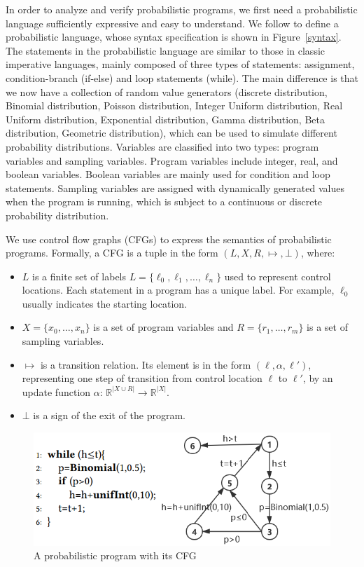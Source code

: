 \documentclass[sigconf,review, anonymous]{acmart}
\begin{document}
In order to analyze and verify probabilistic programs, we first need a probabilistic language sufficiently expressive and easy to understand. We follow \cite{Sankaranarayanan2013Static} to define a probabilistic language, whose syntax specification is shown in Figure~\ref{syntax}. The statements in the probabilistic language are similar to those in classic imperative languages, mainly composed of three types of statements: assignment, condition-branch (if-else) and loop statements (while). The main difference is that we now have a collection of random value generators (discrete distribution, Binomial distribution, Poisson distribution, Integer Uniform distribution, Real Uniform distribution, Exponential distribution, Gamma distribution, Beta distribution, Geometric distribution), which can be used to simulate different probability distributions. Variables are classified into two types: program variables and sampling variables. Program variables include integer, real, and boolean variables. Boolean variables are mainly used for condition and loop statements. Sampling variables are assigned with dynamically generated values when the program is running, which is subject to a continuous or discrete probability distribution.


We use control flow graphs (CFGs) to express the semantics of probabilistic programs. Formally, a CFG is a tuple in the form $(L,X,R,\mapsto,\bot)$, where:

\begin{itemize}
	\item $L$ is a finite set of labels $L=\{\ell_0,\ell_1,\dots,\ell_n\}$ used to represent control locations. Each statement in a program has a unique label. For example, $\ell_0$ usually indicates the starting location.
	
	\item $X=\{x_0,\dots,x_n\}$ is a set of program variables and $R=\{r_1,\dots,r_m\}$ is a set of sampling variables.
	
	\item $\mapsto$ is a transition relation. Its element is in the form $(\ell,\alpha,\ell')$, representing one step of transition from control location $\ell$ to $\ell'$, by an update function $\alpha$: $\mathbb{R}^{|X\cup R|}\to \mathbb{R}^{|X|}$.
	
	\item $\bot$ is a sign of the exit of the program.
\end{itemize}


\begin{figure}[h]
	\centering
	\includegraphics[scale=0.7]{img/example}
	\caption{A probabilistic program with its CFG}
	\label{example1}
\end{figure}
\end{document}
